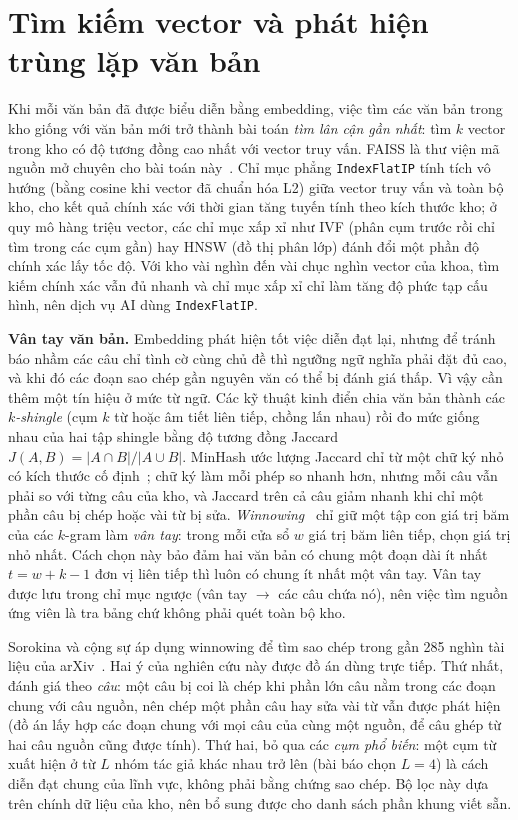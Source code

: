 \documentclass[../main.tex]{subfiles}
\begin{document}
\section{Tìm kiếm vector và phát hiện trùng lặp văn bản}\label{sec:c1-trung-lap}

Khi mỗi văn bản đã được biểu diễn bằng embedding, việc tìm các văn bản trong kho giống với văn bản mới trở thành bài toán \textit{tìm lân cận gần nhất}: tìm $k$ vector trong kho có độ tương đồng cao nhất với vector truy vấn. FAISS là thư viện mã nguồn mở chuyên cho bài toán này~\cite{faiss2021}. Chỉ mục phẳng \texttt{IndexFlatIP} tính tích vô hướng (bằng cosine khi vector đã chuẩn hóa L2) giữa vector truy vấn và toàn bộ kho, cho kết quả chính xác với thời gian tăng tuyến tính theo kích thước kho; ở quy mô hàng triệu vector, các chỉ mục xấp xỉ như IVF (phân cụm trước rồi chỉ tìm trong các cụm gần) hay HNSW (đồ thị phân lớp) đánh đổi một phần độ chính xác lấy tốc độ. Với kho vài nghìn đến vài chục nghìn vector của khoa, tìm kiếm chính xác vẫn đủ nhanh và chỉ mục xấp xỉ chỉ làm tăng độ phức tạp cấu hình, nên dịch vụ AI dùng \texttt{IndexFlatIP}.

\textbf{Vân tay văn bản.} Embedding phát hiện tốt việc diễn đạt lại, nhưng để tránh báo nhầm các câu chỉ tình cờ cùng chủ đề thì ngưỡng ngữ nghĩa phải đặt đủ cao, và khi đó các đoạn sao chép gần nguyên văn có thể bị đánh giá thấp. Vì vậy cần thêm một tín hiệu ở mức từ ngữ. Các kỹ thuật kinh điển chia văn bản thành các \textit{$k$-shingle} (cụm $k$ từ hoặc âm tiết liên tiếp, chồng lấn nhau) rồi đo mức giống nhau của hai tập shingle bằng độ tương đồng Jaccard $J(A,B) = |A \cap B| / |A \cup B|$. MinHash ước lượng Jaccard chỉ từ một chữ ký nhỏ có kích thước cố định~\cite{broder1997}; chữ ký làm mỗi phép so nhanh hơn, nhưng mỗi câu vẫn phải so với từng câu của kho, và Jaccard trên cả câu giảm nhanh khi chỉ một phần câu bị chép hoặc vài từ bị sửa. \textit{Winnowing}~\cite{schleimer2003} chỉ giữ một tập con giá trị băm của các $k$-gram làm \textit{vân tay}: trong mỗi cửa sổ $w$ giá trị băm liên tiếp, chọn giá trị nhỏ nhất. Cách chọn này bảo đảm hai văn bản có chung một đoạn dài ít nhất $t = w + k - 1$ đơn vị liên tiếp thì luôn có chung ít nhất một vân tay. Vân tay được lưu trong chỉ mục ngược (vân tay $\rightarrow$ các câu chứa nó), nên việc tìm nguồn ứng viên là tra bảng chứ không phải quét toàn bộ kho.

Sorokina và cộng sự áp dụng winnowing để tìm sao chép trong gần 285 nghìn tài liệu của arXiv~\cite{sorokina2006}. Hai ý của nghiên cứu này được đồ án dùng trực tiếp. Thứ nhất, đánh giá theo \textit{câu}: một câu bị coi là chép khi phần lớn câu nằm trong các đoạn chung với câu nguồn, nên chép một phần câu hay sửa vài từ vẫn được phát hiện (đồ án lấy hợp các đoạn chung với mọi câu của cùng một nguồn, để câu ghép từ hai câu nguồn cũng được tính). Thứ hai, bỏ qua các \textit{cụm phổ biến}: một cụm từ xuất hiện ở từ $L$ nhóm tác giả khác nhau trở lên (bài báo chọn $L = 4$) là cách diễn đạt chung của lĩnh vực, không phải bằng chứng sao chép. Bộ lọc này dựa trên chính dữ liệu của kho, nên bổ sung được cho danh sách phần khung viết sẵn.
\end{document}
